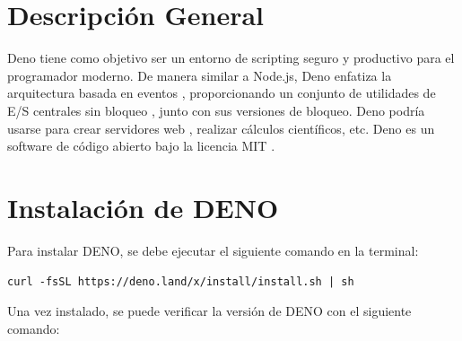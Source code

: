 \documentclass[12pt]{article}
\begin{document}
\section{Descripción General}

\noindent
Deno tiene como objetivo ser un entorno de scripting seguro y productivo para el programador moderno. De manera similar a Node.js, Deno enfatiza la arquitectura basada en eventos , proporcionando un conjunto de utilidades de E/S centrales sin bloqueo , junto con sus versiones de bloqueo. Deno podría usarse para crear servidores web , realizar cálculos científicos, etc. Deno es un software de código abierto bajo la licencia MIT .

\newpage

\section{Instalación de DENO}

Para instalar DENO, se debe ejecutar el siguiente comando en la terminal:

\begin{center}
    \begin{tcolorbox}[colback=questionbg]
        \texttt{curl -fsSL https://deno.land/x/install/install.sh | sh}
    \end{tcolorbox}  
\end{center}

Una vez instalado, se puede verificar la versión de DENO con el siguiente comando:
\end{document}
